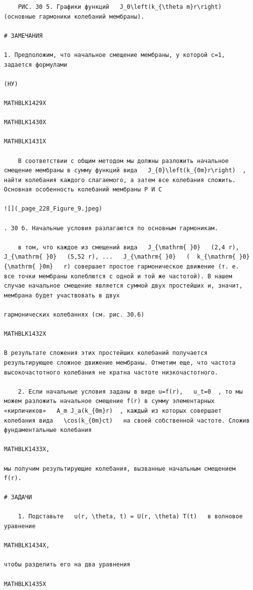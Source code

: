 \documentclass[
]{article}
\begin{document}
\begin{verbatim}
    РИС. 30 5. Графики функций   J_0\left(k_{\theta m}r\right)   (основные гармоники колебаний мембраны).

# ЗАМЕЧАНИЯ

1. Предположим, что начальное смещение мембраны, у которой c=1, задается формулами

(НУ)

MATHBLK1429X

MATHBLK1430X

MATHBLK1431X

    В соответствии с общим методом мы должны разложить начальное смещение мембраны в сумму функций вида   J_{0}\left(k_{0m}r\right)  , найти колебания каждого слагаемого, а затем все колебания сложить. Основная особенность колебаний мембраны Р И С

![](_page_228_Figure_9.jpeg)

. 30 б. Начальные условия разлагаются по основным гармоникам.

    в том, что каждое из смещений вида   J_{\mathrm{ }0}   (2,4 r),   J_{\mathrm{ }0}   (5,52 r), ...   J_{\mathrm{ }0}   (  k_{\mathrm{ }0} {\mathrm{ }0m}   r) совершает простое гармоническое движение (т. е. все точки мембраны колеблются с одной и той же частотой). В нашем случае начальное смещение является суммой двух простейших и, значит, мембрана будет участвовать в двух

гармонических колебаннях (см. рис. 30.6)

MATHBLK1432X

В результате сложения этих простейших колебаний получается результирующее сложное движение мембраны. Отметим еще, что частота высокочастотного колебания не кратна частоте низкочастотного.

    2. Если начальные условия заданы в виде u=f(r),   u_t=0  , то мы можем разложить начальное смещение f(r) в сумму элементарных «кирпичиков»   A_m J_a(k_{0m}r)  , каждый из которых совершает колебания вида   \cos(k_{0m}ct)   на своей собственной частоте. Сложив фундаментальные колебания

MATHBLK1433X,

мы получим результирующие колебания, вызванные начальным смещением f(r).

# ЗАДАЧИ

    1. Подставьте   u(r, \theta, t) = U(r, \theta) T(t)   в волновое уравнение

MATHBLK1434X,

чтобы разделить его на два уравнения

MATHBLK1435X


\end{verbatim}
\end{document}
